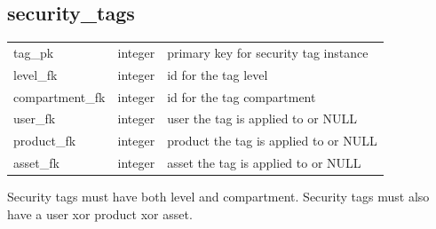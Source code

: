 \subsection*{security\_tags}
\begin{tabular}{l|l|l}
\hline
tag\_pk & integer & primary key for security tag instance \\
level\_fk & integer & id for the tag level \\
compartment\_fk & integer & id for the tag compartment \\
user\_fk & integer & user the tag is applied to or NULL \\
product\_fk & integer & product the tag is applied to or NULL \\
asset\_fk & integer & asset the tag is applied to or NULL \\
\hline
\end{tabular}

Security tags must have both level and compartment. Security tags must also have a user xor product xor asset.

